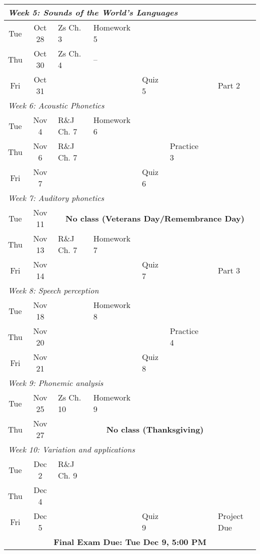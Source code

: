 \documentclass[12pt, letterpaper]{article}
\begin{document}
\begin{longtable}{|c|c|l|p{3cm}|p{1.25cm}|l|l|l|}
\multicolumn{8}{|l|}{\textit{Week 5: Sounds of the World's Languages}} \\ \hline
Tue & Oct 28  & Zs Ch. 3 & Homework 5 & & & & \\ \hline
Thu & Oct 30  & Zs Ch. 4 & -- & & & & \\ \hline
Fri & Oct 31  & & & Quiz 5 & & & Part 2 \\ \hline

\multicolumn{8}{|l|}{\textit{Week 6: Acoustic Phonetics}} \\ \hline
Tue & Nov 4   & R\&J Ch. 7 & Homework 6 & & & & \\ \hline
Thu & Nov 6   & R\&J Ch. 7 &  & & Practice 3 & & \\ \hline
Fri & Nov 7   & & & Quiz 6 & & & \\ \hline

\multicolumn{8}{|l|}{\textit{Week 7: Auditory phonetics}} \\ \hline
Tue & Nov 11  & \multicolumn{6}{c|}{\textbf{No class (Veterans Day/Remembrance Day)}} \\ \hline
Thu & Nov 13  & R\&J Ch. 7 & Homework 7 & & & & \\ \hline
Fri & Nov 14  & & & Quiz 7 & & & Part 3 \\ \hline

\multicolumn{8}{|l|}{\textit{Week 8: Speech perception}} \\ \hline
Tue & Nov 18  & & Homework 8 & & & & \\ \hline
Thu & Nov 20  & & & & Practice 4 & & \\ \hline
Fri & Nov 21  & & & Quiz 8 & & & \\ \hline

\multicolumn{8}{|l|}{\textit{Week 9: Phonemic analysis }} \\ \hline
Tue & Nov 25  & Zs Ch. 10 & Homework 9 & & & & \\ \hline
Thu & Nov 27  & \multicolumn{6}{c|}{\textbf{No class (Thanksgiving)}} \\ \hline

\multicolumn{8}{|l|}{\textit{Week 10: Variation and applications}} \\ \hline
Tue & Dec 2   & R\&J Ch. 9 & & & & & \\ \hline
Thu & Dec 4   & & & &  & & \\ \hline
Fri & Dec 5   & & & Quiz 9 & & & Project Due \\ \hline

\multicolumn{8}{|c|}{\textbf{Final Exam Due: Tue Dec 9, 5:00 PM}} \\ \hline
\end{longtable}



\end{document}
